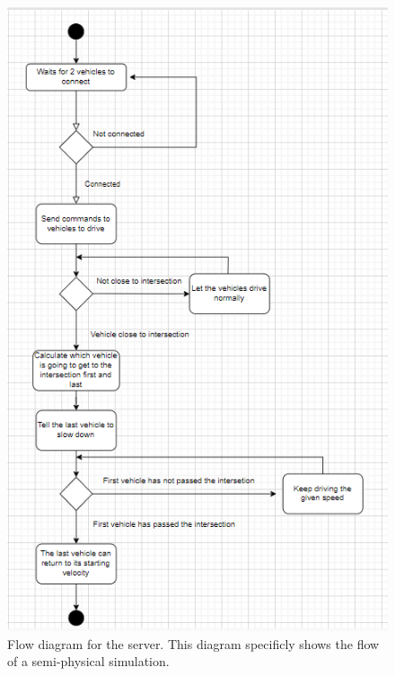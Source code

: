 \begin{figure}[h!]
	\centering
	\includegraphics[width=1\linewidth]{figures/Flow_diagram_server}
	\caption[Flow diagram server]{Flow diagram for the server. This diagram specificly shows the flow of a semi-physical simulation.}
	\label{fig:diagramserver}
\end{figure}
\clearpage
%
%
%
%
% 


%
% 
% 
% 
% 


